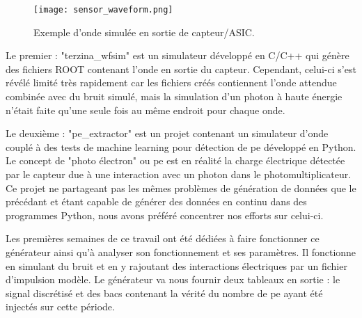 \begin{figure}[tbph!]
	\centering
	\texttt{[image: sensor\_waveform.png]}
	\caption[Exemple d'onde simulée]{Exemple d'onde simulée en sortie de capteur/ASIC.}
\end{figure}

Le premier : "terzina\_wfsim" est un simulateur développé en C/C++ qui génère des fichiers ROOT contenant l'onde en sortie du capteur.
Cependant, celui-ci s'est révélé limité très rapidement car les fichiers créés contiennent l'onde attendue combinée avec du bruit simulé,
mais la simulation d'un photon à haute énergie n'était faite qu'une seule fois au même endroit pour chaque onde.

Le deuxième : "pe\_extractor" \cite{PeExtractor} est un projet contenant un simulateur d'onde couplé à des tests de machine learning pour détection de \gls{pe} développé en Python.
Le concept de "photo électron" ou \gls{pe} est en réalité la charge électrique détectée par le capteur due à une interaction avec un photon dans le photomultiplicateur.
Ce projet ne partageant pas les mêmes problèmes de génération de données que le précédant et étant capable de générer des données en continu dans des programmes Python,
nous avons préféré concentrer nos efforts sur celui-ci.

Les premières semaines de ce travail ont été dédiées à faire fonctionner ce générateur ainsi qu'à analyser son fonctionnement et ses paramètres.
Il fonctionne en simulant du bruit et en y rajoutant des interactions électriques par un fichier d'impulsion modèle. 
Le générateur va nous fournir deux tableaux en sortie : le signal discrétisé et des bacs contenant la vérité du nombre de \gls{pe} ayant été injectés sur cette période.


